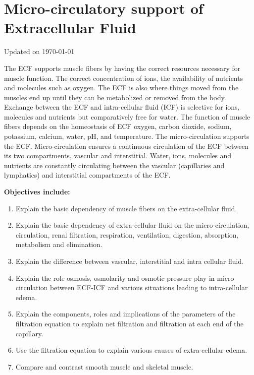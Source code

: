 \chapter{Micro-circulatory support of Extracellular Fluid}\label{chp:ecf_microcirculation}
Updated on \today
\minitoc

The ECF supports muscle fibers by having the correct resources necessary for muscle function. The correct concentration of ions, the availability of nutrients and molecules such as oxygen. The ECF is also where things moved from the muscles end up until they can be metabolized or removed from the body. Exchange between the ECF and intra-cellular fluid (ICF) is selective for ions, molecules and nutrients but comparatively free for water. The function of muscle fibers depends on the homeostasis of ECF oxygen, carbon dioxide, sodium, potassium, calcium, water, pH, and temperature.
The micro-circulation supports the ECF. Micro-circulation ensures a continuous circulation of the ECF between its two compartments, vascular and interstitial. Water, ions, molecules and nutrients are constantly circulating between the vascular (capillaries and lymphatics) and interstitial compartments of the ECF. 

\vspace{5mm}

\textbf{Objectives include:}
\begin{enumerate}
    \item Explain the basic dependency of muscle fibers on the extra-cellular fluid.
    \item Explain the basic dependency of extra-cellular fluid on the micro-circulation, circulation, renal filtration, respiration, ventilation, digestion, absorption, metabolism and elimination.
    \item Explain the difference between vascular, interstitial and intra cellular fluid.
    \item Explain the role osmosis, osmolarity and osmotic pressure play in micro circulation between ECF-ICF and various situations leading to intra-cellular edema.
    \item Explain the components, roles and implications of the parameters of the filtration equation to explain net filtration and filtration at each end of the capillary.
    \item Use the filtration equation to explain various causes of extra-cellular edema.
    \item Compare and contrast smooth muscle and skeletal muscle.
\end{enumerate}

